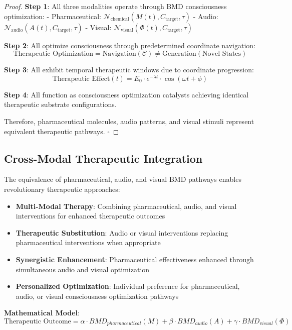 \documentclass[12pt,a4paper]{article}
\begin{document}
\begin{proof}
\textbf{Step 1}: All three modalities operate through BMD consciousness optimization:
- Pharmaceutical: $\mathcal{N}_{\text{chemical}}(M(t), C_{\text{target}}, \tau)$
- Audio: $\mathcal{N}_{\text{audio}}(A(t), C_{\text{target}}, \tau)$
- Visual: $\mathcal{N}_{\text{visual}}(\Phi(t), C_{\text{target}}, \tau)$

\textbf{Step 2}: All optimize consciousness through predetermined coordinate navigation:
$$\text{Therapeutic Optimization} = \text{Navigation}(\mathcal{C}) \neq \text{Generation}(\text{Novel States})$$

\textbf{Step 3}: All exhibit temporal therapeutic windows due to coordinate progression:
$$\text{Therapeutic Effect}(t) = E_0 \cdot e^{-\lambda t} \cdot \cos(\omega t + \phi)$$

\textbf{Step 4}: All function as consciousness optimization catalysts achieving identical therapeutic substrate configurations.

Therefore, pharmaceutical molecules, audio patterns, and visual stimuli represent equivalent therapeutic pathways. $\square$
\end{proof}

\subsection{Cross-Modal Therapeutic Integration}

The equivalence of pharmaceutical, audio, and visual BMD pathways enables revolutionary therapeutic approaches:

\begin{itemize}
\item \textbf{Multi-Modal Therapy}: Combining pharmaceutical, audio, and visual interventions for enhanced therapeutic outcomes
\item \textbf{Therapeutic Substitution}: Audio or visual interventions replacing pharmaceutical interventions when appropriate
\item \textbf{Synergistic Enhancement}: Pharmaceutical effectiveness enhanced through simultaneous audio and visual optimization
\item \textbf{Personalized Optimization}: Individual preference for pharmaceutical, audio, or visual consciousness optimization pathways
\end{itemize}

\textbf{Mathematical Model}:
$$\text{Therapeutic Outcome} = \alpha \cdot BMD_{pharmaceutical}(M) + \beta \cdot BMD_{audio}(A) + \gamma \cdot BMD_{visual}(\Phi)$$
\end{document}
